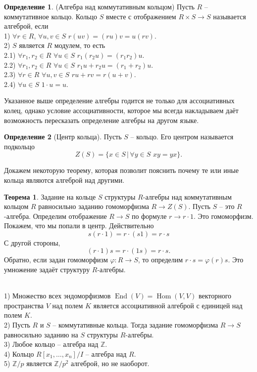 \documentclass[10pt,a4paper,oneside]{book}
\theoremstyle{definition}
\newtheorem*{defn}{Определение}
\newtheorem{thm}{Теорема}
\newcommand{\mb}[1]{\mathbb{#1}}
\newcommand{\Hom}{\operatorname{Hom}}
\newcommand{\End}{\operatorname{End}}
\def\exm{\noindent {\bf Примеры:}}
\def\ffi{\varphi}
\def\thrm{\begin{thm}}
\def\ethrm{\end{thm}}
\def\dfn{\begin{defn}}
\def\edfn{\end{defn}}
\begin{document}
\dfn(Алгебра над коммутативным кольцом) Пусть $R$ -- коммутативное кольцо. Кольцо $S$ вместе с отображением $R \times S \to S$ называется алгеброй, если \\
1) $\forall r \in R$, $\forall u,v \in S$ $r(uv)=(ru)v=u(rv)$.\\
2) $S$ является $R$ модулем, то есть \\
2.1) $\forall r_1,r_2 \in R$ $\forall u \in S$ $r_1(r_2u)=(r_1r_2)u$.\\
2.2) $\forall r_1,r_2 \in R$ $\forall u \in S$ $r_1u+r_2u=(r_1+r_2)u$.\\
2.3) $\forall r \in R$ $\forall u,v \in S$ $ru+rv=r(u+v)$.\\
2.4)  $\forall u\in S$ $1\cdot u=u$.
\edfn



Указанное выше определение алгебры годится не только для ассоциативных колец, однако условие ассоциативности, которое мы всегда накладываем даёт возможность пересказать определение алгебры на другом языке.

\dfn[Центр кольца] Пусть $S$ -- кольцо. Его центром называется подкольцо
$$Z(S)=\{x\in S\,|\, \forall y \in S \,\, xy=yx\}.$$
\edfn

Докажем некоторую теорему, которая позволит пояснить почему те или иные кольца являются алгеброй над другими.


\thrm Задание на кольце $S$ структуры $R$-алгебры над коммутативным кольцом $R$ равносильно заданию гомоморфизма $R \to Z(S)$.
\proof
Пусть $S$ -- это $R$-алгебра. Определим отображение $R\to S$ по формуле $r \to r\cdot 1$. Это гомоморфизм. Покажем, что мы попали в центр. Действительно
$$s(r\cdot 1)= r\cdot (s1)=r\cdot s$$
С другой стороны,
$$(r\cdot 1)s=r\cdot(1s)=r\cdot s.$$
Обратно, если задан гомоморфизм $\ffi \colon R \to S$, то определим $r\cdot s=\ffi(r)s$. Это умножение задаёт структуру $R$-алгебры.
\endproof
\ethrm

\exm \\
1) Множество всех эндоморфизмов $\End(V)=\Hom(V,V)$ векторного пространства $V$ над полем $K$ является ассоциативной алгеброй с единицей над полем $K$.\\
2) Пусть $R$ и $S$ -- коммутативные кольца. Тогда задание гомоморфизма $R \to S$ равносильно заданию на $S$ структуры $R$-алгебры. \\
3) Любое кольцо -- алгебра над $\mb Z$.\\
4) Кольцо $R[x_1,\dots,x_n]/I $ -- алгебра над $R$.\\
5) $\mb Z/p$ является $\mb Z/p^2$ алгеброй, но не наоборот.\\
\end{document}
